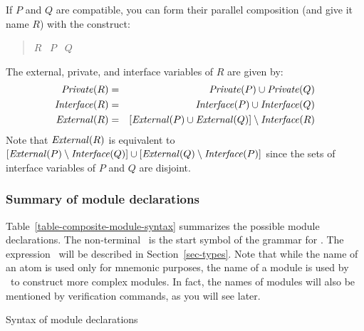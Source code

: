 {\begin{itemize}
\end{itemize}
%
If $P$ and $Q$ are compatible, you can form their parallel composition
(and give it name $R$) with the construct:
%
\begin{quote}
$R$ \ASSIGN\ $P$ \PAR\ $Q$
\end{quote}
%
The external, private, and interface variables of $R$ are given by: 
%
\begin{eqnarray*}
  \mbox{\it Private\/}(R) & = & \mbox{\it Private\/}(P) \cup \mbox{\it Private\/}(Q) \\
  \mbox{\it Interface\/}(R) & = & \mbox{\it Interface\/}(P) \cup \mbox{\it Interface\/}(Q) \\
  \mbox{\it External\/}(R) & = & [\mbox{\it External\/}(P) \cup \mbox{\it External\/}(Q)] \setminus \mbox{\it Interface\/}(R)
\end{eqnarray*}
%
Note that $\mbox{\it External\/}(R)$ is equivalent to
$[\mbox{\it External\/}(P) \setminus \mbox{\it Interface\/}(Q)] \cup [\mbox{\it External\/}(Q) \setminus \mbox{\it Interface\/}(P)]$
since the sets of interface variables of $P$ and $Q$ are disjoint.

\subsubsection{Summary of module declarations}

Table~\ref{table-composite-module-syntax} summarizes the possible module declarations.
The non-terminal \program\ is the start symbol of the grammar for \rem.
The expression \typedefinition\ will be described in Section~\ref{sec-types}.
Note that while the name of an
atom is used only for mnemonic purposes, the name
of a module is used by \mocha\ to construct more complex modules.  In
fact, the names of modules will also be mentioned by verification
commands, as you will see later. 

\begin{table}
\caption{Syntax of module declarations}
\label{table-composite-module-syntax}
\end{table}

}
